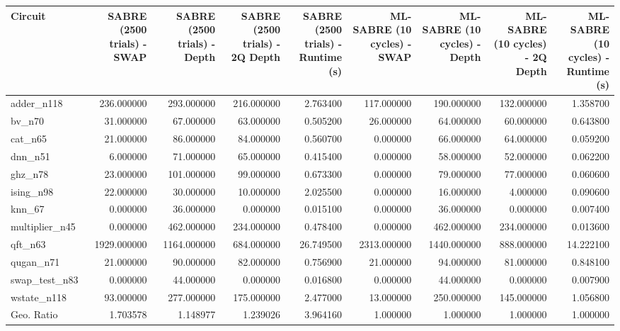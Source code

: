 \begin{tabular}{lrrrrrrrr}
\toprule
Circuit & SABRE (2500 trials) - SWAP & SABRE (2500 trials) - Depth & SABRE (2500 trials) - 2Q Depth & SABRE (2500 trials) - Runtime (s) & ML-SABRE (10 cycles) - SWAP & ML-SABRE (10 cycles) - Depth & ML-SABRE (10 cycles) - 2Q Depth & ML-SABRE (10 cycles) - Runtime (s) \\
\midrule
adder\_n118 & 236.000000 & 293.000000 & 216.000000 & 2.763400 & 117.000000 & 190.000000 & 132.000000 & 1.358700 \\
bv\_n70 & 31.000000 & 67.000000 & 63.000000 & 0.505200 & 26.000000 & 64.000000 & 60.000000 & 0.643800 \\
cat\_n65 & 21.000000 & 86.000000 & 84.000000 & 0.560700 & 0.000000 & 66.000000 & 64.000000 & 0.059200 \\
dnn\_n51 & 6.000000 & 71.000000 & 65.000000 & 0.415400 & 0.000000 & 58.000000 & 52.000000 & 0.062200 \\
ghz\_n78 & 23.000000 & 101.000000 & 99.000000 & 0.673300 & 0.000000 & 79.000000 & 77.000000 & 0.060600 \\
ising\_n98 & 22.000000 & 30.000000 & 10.000000 & 2.025500 & 0.000000 & 16.000000 & 4.000000 & 0.090600 \\
knn\_67 & 0.000000 & 36.000000 & 0.000000 & 0.015100 & 0.000000 & 36.000000 & 0.000000 & 0.007400 \\
multiplier\_n45 & 0.000000 & 462.000000 & 234.000000 & 0.478400 & 0.000000 & 462.000000 & 234.000000 & 0.013600 \\
qft\_n63 & 1929.000000 & 1164.000000 & 684.000000 & 26.749500 & 2313.000000 & 1440.000000 & 888.000000 & 14.222100 \\
qugan\_n71 & 21.000000 & 90.000000 & 82.000000 & 0.756900 & 21.000000 & 94.000000 & 81.000000 & 0.848100 \\
swap\_test\_n83 & 0.000000 & 44.000000 & 0.000000 & 0.016800 & 0.000000 & 44.000000 & 0.000000 & 0.007900 \\
wstate\_n118 & 93.000000 & 277.000000 & 175.000000 & 2.477000 & 13.000000 & 250.000000 & 145.000000 & 1.056800 \\
Geo. Ratio & 1.703578 & 1.148977 & 1.239026 & 3.964160 & 1.000000 & 1.000000 & 1.000000 & 1.000000 \\
\bottomrule
\end{tabular}
